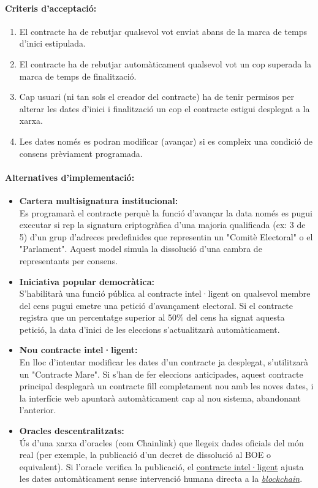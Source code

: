 \paragraph{Criteris d'acceptació:}
\begin{enumerate}[label=\roman*.]
    \item El contracte ha de rebutjar qualsevol vot enviat abans de la marca de temps d'inici estipulada.
    \item El contracte ha de rebutjar automàticament qualsevol vot un cop superada la marca de temps de finalització.
    \item Cap usuari (ni tan sols el creador del contracte) ha de tenir permisos per alterar les dates d'inici i finalització un cop el contracte estigui desplegat a la xarxa.
    \item Les dates només es podran modificar (avançar) si es compleix una condició de consens prèviament programada.
\end{enumerate}

\paragraph{Alternatives d'implementació:}
\begin{itemize}
    \item \textbf{Cartera multisignatura institucional:} \\ Es programarà el contracte perquè la funció d'avançar la data només es pugui executar si rep la signatura criptogràfica d'una majoria qualificada (ex: 3 de 5) d'un grup d'adreces predefinides que representin un "Comitè Electoral" o el "Parlament". Aquest model simula la dissolució d'una cambra de representants per consens.
    \item \textbf{Iniciativa popular democràtica:} \\ S'habilitarà una funció pública al contracte intel·ligent on qualsevol membre del cens pugui emetre una petició d'avançament electoral. Si el contracte registra que un percentatge superior al 50\% del cens ha signat aquesta petició, la data d'inici de les eleccions s'actualitzarà automàticament.
    \item \textbf{Nou contracte intel·ligent:} \\ En lloc d'intentar modificar les dates d'un contracte ja desplegat, s'utilitzarà un "Contracte Mare". Si s'han de fer eleccions anticipades, aquest contracte principal desplegarà un contracte fill completament nou amb les noves dates, i la interfície web apuntarà automàticament cap al nou sistema, abandonant l'anterior.
    \item \textbf{Oracles descentralitzats:} \\ Ús d'una xarxa d'oracles (com Chainlink) que llegeix dades oficials del món real (per exemple, la publicació d'un decret de dissolució al BOE o equivalent). Si l'oracle verifica la publicació, el \hyperlink{def:smartcontract}{contracte intel·ligent} ajusta les dates automàticament sense intervenció humana directa a la \hyperlink{def:blockchain}{\textit{blockchain}}.
\end{itemize}

